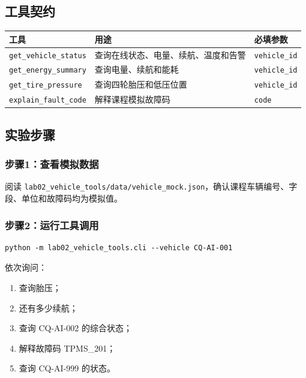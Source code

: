 \documentclass[UTF8,zihao=-4]{ctexart}
\begin{document}
\subsection{工具契约}

\begin{table}[htbp]
\centering
\begin{tabularx}{\textwidth}{L{4.2cm} Y L{3.2cm}}
\toprule
工具 & 用途 & 必填参数\\
\midrule
\texttt{get\_vehicle\_status} & 查询在线状态、电量、续航、温度和告警 & \texttt{vehicle\_id}\\
\texttt{get\_energy\_summary} & 查询电量、续航和能耗 & \texttt{vehicle\_id}\\
\texttt{get\_tire\_pressure} & 查询四轮胎压和低压位置 & \texttt{vehicle\_id}\\
\texttt{explain\_fault\_code} & 解释课程模拟故障码 & \texttt{code}\\
\bottomrule
\end{tabularx}
\end{table}


\subsection{实验步骤}

\subsubsection{步骤1：查看模拟数据}

阅读 \texttt{lab02\_vehicle\_tools/data/vehicle\_mock.json}，确认课程车辆编号、字段、单位和故障码均为模拟值。

\subsubsection{步骤2：运行工具调用}

\begin{lstlisting}
python -m lab02_vehicle_tools.cli --vehicle CQ-AI-001
\end{lstlisting}

依次询问：

\begin{enumerate}
  \item 查询胎压；
  \item 还有多少续航；
  \item 查询 CQ-AI-002 的综合状态；
  \item 解释故障码 TPMS\_201；
  \item 查询 CQ-AI-999 的状态。
\end{enumerate}
\end{document}
